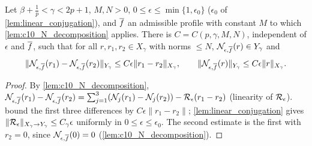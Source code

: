 \begin{lemma}
  \label{lem:c10_N_admissible_bounds}
  Let $\beta+\frac1p<\gamma<2p+1$, $M,N>0$, $0\le\epsilon\le\min\{1,\epsilon_0\}$ ($\epsilon_0$ of
  \cref{lem:linear_conjugation}), and $\overline{f}$ an admissible profile with constant $M$ to which
  \cref{lem:c10_N_decomposition} applies. There is $C=C(p,\gamma,M,N)$, independent of $\epsilon$ and $\overline{f}$,
  such that for all $r,r_1,r_2\in X_\gamma$ with norms $\le N$, $\mathcal{N}_{\epsilon,\overline{f}}(r)\in Y_\gamma$ and
  \[
    \|\mathcal{N}_{\epsilon,\overline{f}}(r_1)-\mathcal{N}_{\epsilon,\overline{f}}(r_2)\|_{Y_\gamma}\le C\epsilon\|r_1-r_2\|_{X_\gamma},\qquad
    \|\mathcal{N}_{\epsilon,\overline{f}}(r)\|_{Y_\gamma}\le C\epsilon\|r\|_{X_\gamma}.
  \]
\end{lemma}
\begin{proof}
  By \cref{lem:c10_N_decomposition},
  $\mathcal{N}_{\epsilon,\overline{f}}(r_1)-\mathcal{N}_{\epsilon,\overline{f}}(r_2)=\sum_{j=1}^3(\mathcal{N}_j(r_1)-\mathcal{N}_j(r_2))-\mathcal{R}_\epsilon(r_1-r_2)$
  (linearity of $\mathcal{R}_\epsilon$).  bound the first three differences by
  $C\epsilon\|r_1-r_2\|$; \cref{lem:linear_conjugation} gives $\|\mathcal{R}_\epsilon\|_{X_\gamma\to Y_\gamma}\le C_\gamma\epsilon$
  uniformly in $0\le\epsilon\le\epsilon_0$. The second estimate is the first with $r_2=0$, since
  $\mathcal{N}_{\epsilon,\overline{f}}(0)=0$ (\cref{lem:c10_N_decomposition}).
\end{proof}

